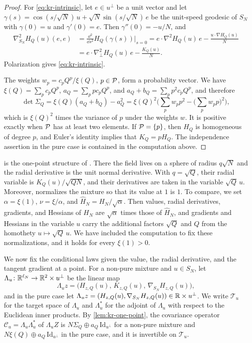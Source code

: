 \begin{proof}
For \eqref{eq:kr-intrinsic}, let $e\in u^\perp$ be a unit vector and let $\gamma(s)=\cos(s/\sqrt N)\,u+\sqrt N\sin(s/\sqrt N)\,e$ be the unit-speed geodesic of $S_N$ with $\gamma(0)=u$ and $\gamma'(0)=e$. Then $\gamma''(0)=-u/N$, and
\[
\begin{aligned}
\nabla^2_{S_N}H_Q(u)(e,e)&=\frac{\dd^2}{\dd s^2}H_Q(\gamma(s))\Big|_{s=0}=e\cdot\nabla^2H_Q(u)\,e-\frac{u\cdot\nabla H_Q(u)}N\\
&=e\cdot\nabla^2_\perp H_Q(u)\,e-\frac{K_Q(u)}N.
\end{aligned}
\]
Polarization gives \eqref{eq:kr-intrinsic}.

The weights $w_p=c_pQ^p/\xi(Q)$, $p\in\mathcal P$, form a probability vector. We have $\xi(Q)=\sum_pc_pQ^p$, $a_Q=\sum_ppc_pQ^p$, and $a_Q+b_Q=\sum_pp^2c_pQ^p$, and therefore
\[
\det\Sigma_Q=\xi(Q)(a_Q+b_Q)-a_Q^2=\xi(Q)^2\Big(\sum_pw_pp^2-\Big(\sum_pw_pp\Big)^2\Big),
\]
which is $\xi(Q)^2$ times the variance of $p$ under the weights $w$. It is positive exactly when $\mathcal P$ has at least two elements. If $\mathcal P=\{p\}$, then $H_Q$ is homogeneous of degree $p$, and Euler's identity implies that $K_Q=pH_Q$. The independence assertion in the pure case is contained in the computation above.
\end{proof}

\begin{remark}\label{rem:kr-one-point}
 is the one-point structure of \cite[Section~4.1, (4.1)]{BenArousSubagZeitouni2020}.
There the field lives on a sphere of radius $q\sqrt N$ and the radial derivative is the unit normal derivative. With $q=\sqrt Q$, their radial variable is $K_Q(u)/\sqrt{QN}$, and their derivatives are taken in the variable $\sqrt Q\,u$. Moreover, \cite{BenArousSubagZeitouni2020} normalizes the mixture so that its value at $1$ is $1$. To compare, we set $\alpha=\xi(1)$, $\nu=\xi/\alpha$, and $\hat H_N=H_N/\sqrt\alpha$. Then values, radial derivatives, gradients, and Hessians of $H_N$ are $\sqrt\alpha$ times those of $\hat H_N$, and gradients and Hessians in the variable $u$ carry the additional factors $\sqrt Q$ and $Q$ from the homothety $u\mapsto\sqrt Q\,u$. We have included the computation to fix these normalizations, and it holds for every $\xi(1)>0$.
\end{remark}

We now fix the conditional laws given the value, the radial derivative, and the tangent gradient at a point. For a non-pure mixture and $u\in S_N$, let $\Lambda_u\colon\mathbb R^{\ell_N}\to\mathbb R^2\times u^\perp$ be the linear map
\[
\Lambda_uz=\big(H_{z,Q}(u),\,K_{z,Q}(u),\,\nabla_{S_N}H_{z,Q}(u)\big),
\]
and in the pure case let $\Lambda_uz=(H_{z,Q}(u),\nabla_{S_N}H_{z,Q}(u))\in\mathbb R\times u^\perp$. We write $\mathcal T_u$ for the target space of $\Lambda_u$ and $\Lambda_u^{*}$ for the adjoint of $\Lambda_u$ with respect to the Euclidean inner products. By \cref{lem:kr-one-point}, the covariance operator $\mathcal C_u=\Lambda_u\Lambda_u^{*}$ of $\Lambda_uZ$ is $N\Sigma_Q\oplus a_Q\,\mathrm{Id}_{u^\perp}$ for a non-pure mixture and $N\xi(Q)\oplus a_Q\,\mathrm{Id}_{u^\perp}$ in the pure case, and it is invertible on $\mathcal T_u$.

